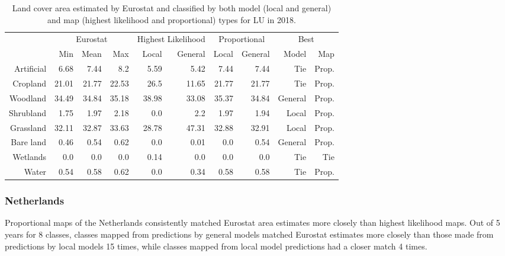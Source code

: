     \begin{table}[H]
    \centering
    \caption{Land cover area estimated by Eurostat and classified by both model (local and general) and map (highest likelihood and proportional) types for LU in 2018.}
    
    \begin{tabular}{r|rrr|rr|rr|rr}
    \toprule
    {} & \multicolumn{3}{|c}{Eurostat} & \multicolumn{2}{|c}{Highest Likelihood} & \multicolumn{2}{|c}{Proportional} & \multicolumn{2}{|c}{Best} \\
    {} &      Min &   Mean &    Max &              Local & General &        Local & General &    Model &    Map \\
    \midrule
    Artificial &     6.68 &   7.44 &    8.2 &               5.59 &    5.42 &         7.44 &    7.44 &      Tie &  Prop. \\
    Cropland   &    21.01 &  21.77 &  22.53 &               26.5 &   11.65 &        21.77 &   21.77 &      Tie &  Prop. \\
    Woodland   &    34.49 &  34.84 &  35.18 &              38.98 &   33.08 &        35.37 &   34.84 &  General &  Prop. \\
    Shrubland  &     1.75 &   1.97 &   2.18 &                0.0 &     2.2 &         1.97 &    1.94 &    Local &  Prop. \\
    Grassland  &    32.11 &  32.87 &  33.63 &              28.78 &   47.31 &        32.88 &   32.91 &    Local &  Prop. \\
    Bare land  &     0.46 &   0.54 &   0.62 &                0.0 &    0.01 &          0.0 &    0.54 &  General &  Prop. \\
    Wetlands   &      0.0 &    0.0 &    0.0 &               0.14 &     0.0 &          0.0 &     0.0 &      Tie &    Tie \\
    Water      &     0.54 &   0.58 &   0.62 &                0.0 &    0.34 &         0.58 &    0.58 &      Tie &  Prop. \\
    \bottomrule
    \end{tabular}
    \end{table}
    
    
    \subsubsection{Netherlands}
    Proportional maps of the Netherlands consistently matched Eurostat area estimates more closely than highest likelihood maps. Out of 5 years for 8 classes, classes mapped from predictions by general models matched Eurostat estimates more closely than those made from predictions by local models 15 times, while classes mapped from local model predictions had a closer match 4 times.
    
